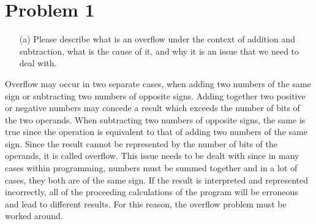 \documentclass[12pt]{article}
\begin{document}
    \section*{Problem 1}
    \begin{itemize}
        \item[(a)] Please describe what is an overflow under the context of addition and subtraction, what is the cause of it, and why it is an issue that we need to deal with.
    \end{itemize}
    \par Overflow may occur in two separate cases, when adding two numbers of the same sign or subtracting two numbers of opposite signs. Adding together two positive or negative numbers may concede a result which exceeds the number of bits of the two operands. When subtracting two numbers of opposite signs, the same is true since the operation is equivalent to that of adding two numbers of the same sign. Since the result cannot be represented by the number of bits of the operands, it is called overflow. This issue needs to be dealt with since in many cases within programming, numbers must be summed together and in a lot of cases, they both are of the same sign. If the result is interpreted and represented incorrectly, all of the proceeding calculations of the program will be erroneous and lead to different results. For this reason, the overflow problem must be worked around.
\end{document}
